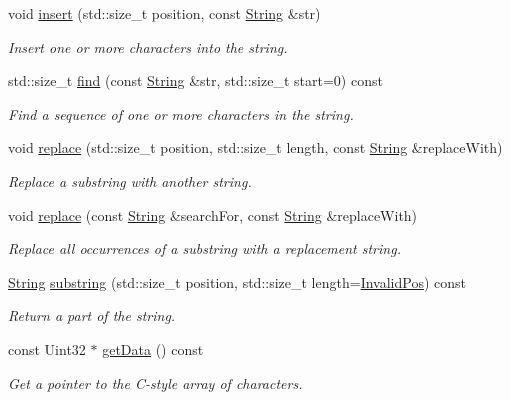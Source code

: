 \begin{DoxyCompactItemize}
void \hyperlink{classsf_1_1_string_ad0b1455deabf07af13ee79812e05fa02}{insert} (std\+::size\+\_\+t position, const \hyperlink{classsf_1_1_string}{String} \&str)
\begin{DoxyCompactList}\small\item\em Insert one or more characters into the string. \end{DoxyCompactList}\item 
std\+::size\+\_\+t \hyperlink{classsf_1_1_string_aa189ec8656854106ab8d2e935fd9cbcc}{find} (const \hyperlink{classsf_1_1_string}{String} \&str, std\+::size\+\_\+t start=0) const
\begin{DoxyCompactList}\small\item\em Find a sequence of one or more characters in the string. \end{DoxyCompactList}\item 
void \hyperlink{classsf_1_1_string_ad460e628c287b0fa88deba2eb0b6744b}{replace} (std\+::size\+\_\+t position, std\+::size\+\_\+t length, const \hyperlink{classsf_1_1_string}{String} \&replace\+With)
\begin{DoxyCompactList}\small\item\em Replace a substring with another string. \end{DoxyCompactList}\item 
void \hyperlink{classsf_1_1_string_a82bbfee2bf23c641e5361ad505c07921}{replace} (const \hyperlink{classsf_1_1_string}{String} \&search\+For, const \hyperlink{classsf_1_1_string}{String} \&replace\+With)
\begin{DoxyCompactList}\small\item\em Replace all occurrences of a substring with a replacement string. \end{DoxyCompactList}\item 
\hyperlink{classsf_1_1_string}{String} \hyperlink{classsf_1_1_string_a492645e00032455e6d92ff0e992654ce}{substring} (std\+::size\+\_\+t position, std\+::size\+\_\+t length=\hyperlink{classsf_1_1_string_abaadecaf12a6b41c54d725c75fd28527}{Invalid\+Pos}) const
\begin{DoxyCompactList}\small\item\em Return a part of the string. \end{DoxyCompactList}\item 
const Uint32 $\ast$ \hyperlink{classsf_1_1_string_a0b38001f1a6b7bdf35bb180da5391929}{get\+Data} () const
\begin{DoxyCompactList}\small\item\em Get a pointer to the C-\/style array of characters. \end{DoxyCompactList}\item 

\end{DoxyCompactItemize}
